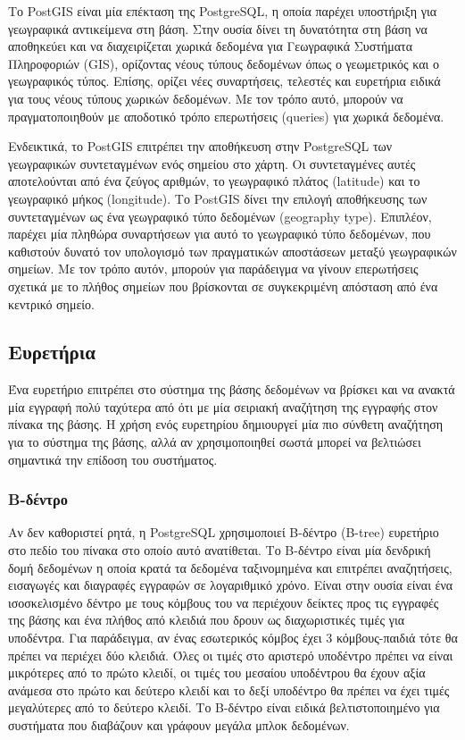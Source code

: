 Το PostGIS είναι μία επέκταση της PostgreSQL, η οποία παρέχει υποστήριξη για γεωγραφικά αντικείμενα στη βάση. Στην ουσία δίνει τη δυνατότητα στη βάση να αποθηκεύει 
και να διαχειρίζεται χωρικά δεδομένα για Γεωγραφικά Συστήματα Πληροφοριών (GIS), ορίζοντας νέους τύπους δεδομένων όπως ο γεωμετρικός και ο γεωγραφικός τύπος. 
Επίσης, ορίζει νέες συναρτήσεις, τελεστές και ευρετήρια ειδικά για τους νέους τύπους χωρικών δεδομένων. Με τον τρόπο αυτό, μπορούν να πραγματοποιηθούν 
με αποδοτικό τρόπο επερωτήσεις (queries) για χωρικά δεδομένα. 

Ενδεικτικά, το PostGIS επιτρέπει την αποθήκευση στην PostgreSQL των γεωγραφικών συντεταγμένων ενός σημείου στο χάρτη. Οι συντεταγμένες αυτές αποτελούνται από ένα 
ζεύγος αριθμών, το γεωγραφικό πλάτος (latitude) και το γεωγραφικό μήκος (longitude). Το PostGIS δίνει την επιλογή αποθήκευσης των συντεταγμένων ως ένα γεωγραφικό 
τύπο δεδομένων (geography type). Επιπλέον, παρέχει μία πληθώρα συναρτήσεων για αυτό το γεωγραφικό τύπο δεδομένων, που καθιστούν δυνατό τον υπολογισμό των πραγματικών 
αποστάσεων μεταξύ γεωγραφικών σημείων. Με τον τρόπο αυτόν, μπορούν για παράδειγμα να γίνουν επερωτήσεις σχετικά με το πλήθος σημείων που βρίσκονται σε συγκεκριμένη 
απόσταση από ένα κεντρικό σημείο.

\subsection{Ευρετήρια}

Ένα ευρετήριο επιτρέπει στο σύστημα της βάσης δεδομένων να βρίσκει και να ανακτά μία εγγραφή πολύ ταχύτερα από ότι με μία σειριακή αναζήτηση της εγγραφής στον πίνακα 
της βάσης. Η χρήση ενός ευρετηρίου δημιουργεί μία πιο σύνθετη αναζήτηση για το σύστημα της βάσης, αλλά αν χρησιμοποιηθεί σωστά μπορεί να βελτιώσει σημαντικά την επίδοση του 
συστήματος. 

\subsubsection{Β-δέντρο}

Αν δεν καθοριστεί ρητά, η PostgreSQL χρησιμοποιεί B-δέντρο (B-tree) ευρετήριο στο πεδίο του πίνακα στο οποίο αυτό ανατίθεται. Το Β-δέντρο είναι μία δενδρική δομή δεδομένων η οποία 
κρατά τα δεδομένα ταξινομημένα και επιτρέπει αναζητήσεις, εισαγωγές και διαγραφές εγγραφών σε λογαριθμικό χρόνο. Είναι στην ουσία είναι ένα ισοσκελισμένο δέντρο με τους 
κόμβους του να περιέχουν δείκτες προς τις εγγραφές της βάσης και ένα πλήθος από κλειδιά που δρουν ως διαχωριστικές τιμές για υποδέντρα. Για παράδειγμα, αν ένας 
εσωτερικός κόμβος έχει 3 κόμβους-παιδιά τότε θα πρέπει να περιέχει δύο κλειδιά. Όλες οι τιμές στο αριστερό υποδέντρο πρέπει να είναι μικρότερες από το πρώτο κλειδί, 
οι τιμές του μεσαίου υποδέντρου θα έχουν αξία ανάμεσα στο πρώτο και δεύτερο κλειδί και το δεξί υποδέντρο θα πρέπει να έχει τιμές μεγαλύτερες από το δεύτερο κλειδί. 
Το Β-δέντρο είναι ειδικά βελτιστοποιημένο για συστήματα που διαβάζουν και γράφουν μεγάλα μπλοκ δεδομένων.

